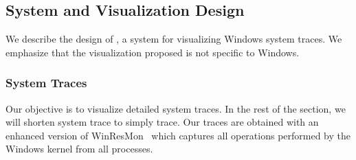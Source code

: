 \subsection{System and Visualization Design}


We describe the design of \lviz{}, a system for visualizing Windows system
traces.
We emphasize that the visualization proposed
is not specific to Windows.

\subsubsection{System Traces}
\label{sec:systrace}

Our objective is to visualize detailed system traces.
In the rest of the section, we will shorten system trace to simply trace.
Our traces are obtained with an enhanced version of
WinResMon~\cite{ramnath2006winresmon} which
captures all operations performed by the Windows kernel
from all processes.


